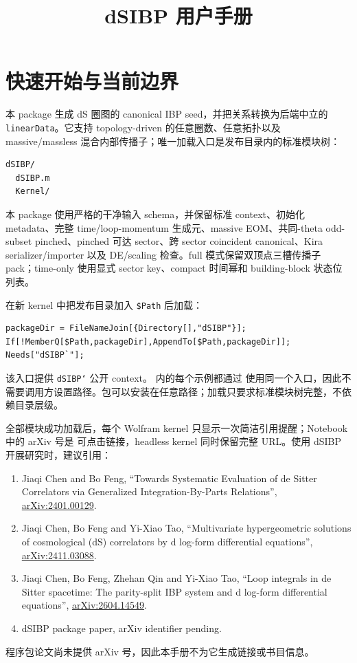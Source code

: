﻿\documentclass[a4paper,11pt]{article}
\title{dSIBP 用户手册}
\begin{document}
\sloppy
\setcounter{tocdepth}{1}
\maketitle
\newpage

\section{快速开始与当前边界}

本 package 生成 dS 圈图的 canonical IBP seed，并把关系转换为后端中立的 \texttt{linearData}。它支持 topology-driven 的任意圈数、任意拓扑以及 massive/massless 混合内部传播子；唯一加载入口是发布目录内的标准模块树：
\begin{verbatim}
dSIBP/
  dSIBP.m
  Kernel/
\end{verbatim}
本 package 使用严格的干净输入 schema，并保留标准 context、初始化 metadata、完整 time/loop-momentum 生成元、massive EOM、共同-theta odd-subset pinched、pinched 可达 sector、跨 sector coincident canonical、Kira serializer/importer 以及 DE/scaling 检查。full 模式保留双顶点三槽传播子 pack；time-only 使用显式 sector key、compact 时间幂和 building-block 状态位列表。

在新 kernel 中把发布目录加入 \texttt{\$Path} 后加载：
\begin{verbatim}
packageDir = FileNameJoin[{Directory[],"dSIBP"}];
If[!MemberQ[$Path,packageDir],AppendTo[$Path,packageDir]];
Needs["dSIBP`"];
\end{verbatim}
该入口提供 \texttt{dSIBP`} 公开 context。 内的每个示例都通过
 使用同一个入口，因此不需要调用方设置路径。包可以安装在任意路径；加载只要求标准模块树完整，不依赖目录层级。

全部模块成功加载后，每个 Wolfram kernel 只显示一次简洁引用提醒；Notebook 中的 arXiv 号是
可点击链接，headless kernel 同时保留完整 URL。使用 dSIBP 开展研究时，建议引用：
\begin{enumerate}
  \item Jiaqi Chen and Bo Feng, ``Towards Systematic Evaluation of de Sitter Correlators via Generalized Integration-By-Parts Relations'', \href{https://arxiv.org/abs/2401.00129}{arXiv:2401.00129}.
  \item Jiaqi Chen, Bo Feng and Yi-Xiao Tao, ``Multivariate hypergeometric solutions of cosmological (dS) correlators by d log-form differential equations'', \href{https://arxiv.org/abs/2411.03088}{arXiv:2411.03088}.
  \item Jiaqi Chen, Bo Feng, Zhehan Qin and Yi-Xiao Tao, ``Loop integrals in de Sitter spacetime: The parity-split IBP system and d log-form differential equations'', \href{https://arxiv.org/abs/2604.14549}{arXiv:2604.14549}.
  \item dSIBP package paper, arXiv identifier pending.
\end{enumerate}
程序包论文尚未提供 arXiv 号，因此本手册不为它生成链接或书目信息。
\end{document}

